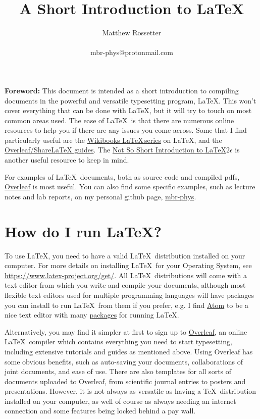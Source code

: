 \documentclass[a4paper]{article}
\title{A Short Introduction to \LaTeX}
\author{Matthew Rossetter \\ \\ mbr-phys@protonmail.com}
\date{}
\begin{document}
\maketitle

\textbf{Foreword:} This document is intended as a short introduction to compiling documents in the powerful and versatile typesetting program, \LaTeX. 
This won't cover everything that can be done with \LaTeX, but it will try to touch on most common areas used. 
The ease of \LaTeX\, is that there are numerous online resources to help you if there are any issues you come across. 
Some that I find particularly useful are the \href{https://en.wikibooks.org/wiki/LaTeX}{Wikibooks \LaTeX\,series} on \LaTeX, and the \href{https://www.overleaf.com/learn}{Overleaf/ShareLaTeX guides}.
The \href{https://tobi.oetiker.ch/lshort/lshort.pdf}{Not So Short Introduction to \LaTeX $2\epsilon$} is another useful resource to keep in mind. 

For examples of \LaTeX\, documents, both as source code and compiled pdfs, \href{https://www.overleaf.com/}{Overleaf} is most useful. 
You can also find some specific examples, such as lecture notes and lab reports, on my personal github page, \href{https://github.com/mbr-phys}{mbr-phys}.

\section{How do I run \LaTeX?}
To use \LaTeX, you need to have a valid \LaTeX\, distribution installed on your computer. 
For more details on installing \LaTeX\, for your Operating System, see \href{https://www.latex-project.org/get/}{https://www.latex-project.org/get/}.
All \LaTeX\, distributions will come with a text editor from which you write and compile your documents, although most flexible text editors used for multiple programming languages will have packages you can install to run \LaTeX\, from them if you prefer, e.g. I find \href{atom.io}{Atom} to be a nice text editor with many \href{https://atom.io/packages/search?q=latex}{packages} for running \LaTeX.

Alternatively, you may find it simpler at first to sign up to \href{https://www.overleaf.com/}{Overleaf}, an online \LaTeX\, compiler which contains everything you need to start typesetting, including extensive tutorials and guides as mentioned above. 
Using Overleaf has some obvious benefits, such as auto-saving your documents, collaborations of joint documents, and ease of use. 
There are also templates for all sorts of documents uploaded to Overleaf, from scientific journal entries to posters and presentations.
However, it is not always as versatile as having a \TeX\, distribution installed on your computer, as well of course as always needing an internet connection and some features being locked behind a pay wall. 
\end{document}
